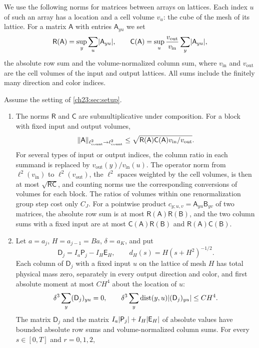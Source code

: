We use the following norms for matrices between arrays on lattices. Each index $u$ of such an array has a location and a cell volume $v_u$: the cube of the mesh of its lattice. For a matrix $\mathsf A$ with entries $\mathsf A_{yu}$ we set
\[
 \mathsf R(\mathsf A)=\sup_y\sum_u\lvert \mathsf A_{yu}\rvert,\qquad
 \mathsf C(\mathsf A)=\sup_u\frac{v_{\mathrm{out}}}{v_{\mathrm{in}}}\sum_y\lvert \mathsf A_{yu}\rvert,
\]
the absolute row sum and the volume-normalized column sum, where $v_{\mathrm{in}}$ and $v_{\mathrm{out}}$ are the cell volumes of the input and output lattices. All sums include the finitely many direction and color indices.

\begin{lemma}\label{ch24:lem:signed-heat-defect}
Assume the setting of \cref{ch23:sec:setup}.
\begin{enumerate}
\item The norms $\mathsf R$ and $\mathsf C$ are submultiplicative under composition. For a block with fixed input and output volumes,
\[
 \lVert \mathsf A\rVert_{\ell^2_{\mathrm{count}}\to\ell^2_{\mathrm{count}}}\le\sqrt{\mathsf R(\mathsf A)\mathsf C(\mathsf A)v_{\mathrm{in}}/v_{\mathrm{out}}}.
\]
For several types of input or output indices, the column ratio in each summand is replaced by $v_{\mathrm{out}}(y)/v_{\mathrm{in}}(u)$. The operator norm from $\ell^2(v_{\mathrm{in}})$ to $\ell^2(v_{\mathrm{out}})$, the $\ell^2$ spaces weighted by the cell volumes, is then at most $\sqrt{\mathsf R\mathsf C}$, and counting norms use the corresponding conversions of volumes for each block. The ratios of volumes within one renormalization group step cost only $C_J$. For a pointwise product $c_{y;u,v}=\mathsf A_{yu}\mathsf B_{yv}$ of two matrices, the absolute row sum is at most $\mathsf R(\mathsf A)\mathsf R(\mathsf B)$, and the two column sums with a fixed input are at most $\mathsf C(\mathsf A)\mathsf R(\mathsf B)$ and $\mathsf R(\mathsf A)\mathsf C(\mathsf B)$.
\item Let $a=a_j$, $H=a_{j-1}=Ba$, $\delta=a_K$, and put
\[
 \mathsf D_j=I_a\mathsf P_j-I_H\mathsf E_H,\qquad d_H(s)=H(s+H^2)^{-1/2}.
\]
Each column of $\mathsf D_j$ with a fixed input $u$ on the lattice of mesh $H$ has total physical mass zero, separately in every output direction and color, and first absolute moment at most $CH^4$ about the location of $u$:
\[
 \delta^3\sum_y(\mathsf D_j)_{yu}=0,\qquad
 \delta^3\sum_y\operatorname{dist}(y,u)\lvert (\mathsf D_j)_{yu}\rvert\le CH^4.
\]
The matrix $\mathsf D_j$ and the matrix $I_a\lvert \mathsf P_j\rvert+I_H\lvert \mathsf E_H\rvert$ of absolute values have bounded absolute row sums and volume-normalized column sums. For every $s\in[0,T]$ and $r=0,1,2$,

\end{enumerate}
\end{lemma}
